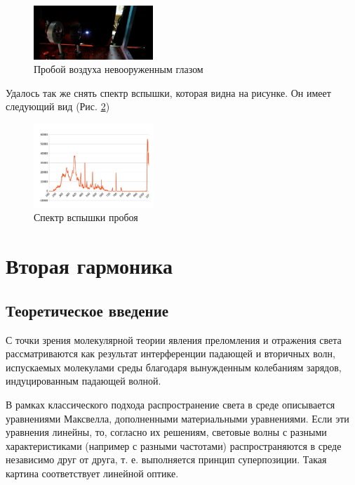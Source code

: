 \documentclass[twocolumn]{article}
\begin{document}

    
       
    \begin{figure}
    \centering
    \includegraphics[width=0.4\textwidth]{LEMPH Report_files/LEMPH Report_40_0.jpeg}
    \caption{Пробой воздуха невооруженным глазом \label{fig:strike}}
    \end{figure}
    
        
        
    
Удалось так же снять спектр вспышки, которая видна на рисунке. Он имеет
следующий вид (Рис. \ref{fig:boom_spectrum})


    
      
    \begin{figure}
    \centering
    \includegraphics[width=0.4\textwidth]{LEMPH Report_files/LEMPH Report_42_0.jpeg}
    \caption{Спектр вспышки пробоя \label{fig:boom_spectrum}}
    \end{figure}
                
        
    
\section{Вторая гармоника}
\subsection{Теоретическое введение}С точки зрения молекулярной теории явления преломления и отражения света
рассматриваются как результат интерференции падающей и вторичных волн,
испускаемых молекулами среды благодаря вынужденным колебаниям зарядов,
индуцированным падающей волной.

В рамках классического подхода распространение света в среде описывается
уравнениями Максвелла, дополненными материальными уравнениями. Если эти
уравнения линейны, то, согласно их решениям, световые волны с разными
характеристиками (например с разными частотами) распространяются в среде
независимо друг от друга, т. е. выполняется принцип суперпозиции. Такая
картина соответствует линейной оптике.
\end{document}
